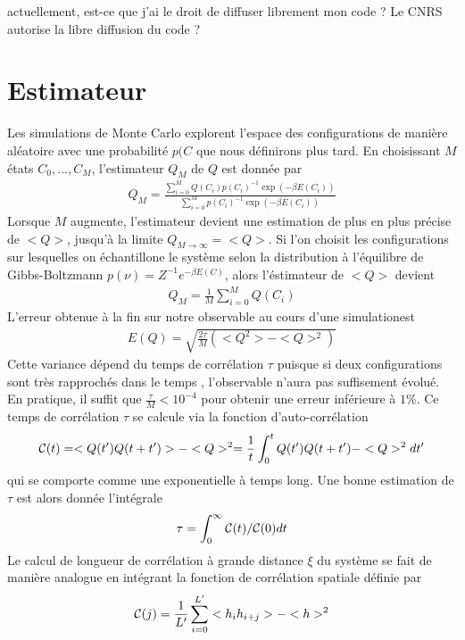 {\color{red} actuellement, est-ce que j'ai le droit de diffuser librement mon code ? Le CNRS autorise la libre diffusion du code ?}

    \section{Estimateur}

Les simulations de Monte Carlo explorent l'espace des configurations de manière aléatoire \cite{newman_monte_1999} avec une probabilité $p(C$ que nous définirons plus tard. En choisissant $M$ états ${C_0,...,C_M}$, l'estimateur $Q_M$ de $Q$ est donnée par
\begin{align}
    Q_M = \frac{\sum_{i=0}^M Q(C_i) p(C_i)^{-1} \exp(-\beta E(C_i))}{\sum_{i=0}^M  p(C_i)^{-1} \exp(-\beta E(C_i))}
\end{align}
Lorsque $M$ augmente, l'estimateur devient une estimation de plus en plus précise de $<Q>$, jusqu'à la limite $Q_{M\to \infty} = <Q>$. Si l'on choisit les configurations sur lesquelles on échantillone le système selon la distribution à l'équilibre de Gibbs-Boltzmann $p(\nu) = Z^{-1} e^{-\beta E(C)}$, alors l'éstimateur de $<Q>$ devient
\begin{align}
    Q_M = \frac{1}{M} \sum_{i=0}^M Q(C_i)
\end{align}
L'erreur obtenue à la fin sur notre observable au cours d'une simulationest
\begin{align}
	E(Q) = \sqrt{\frac{2 \tau}{M} (<Q^2>-<Q>^2)} 
\end{align}
Cette variance dépend du temps de corrélation $\tau$ puisque si deux configurations sont très rapprochés dans le temps , l'observable n'aura pas suffisement évolué. En pratique, il suffit que $\frac{\tau}{M} \less 10^{-4}$ pour obtenir une erreur inférieure à $1\%$. Ce temps de corrélation $\tau$ se calcule via la fonction d'auto-corrélation 
\begin{align}
\mathcal{C}(t) = <Q(t')Q(t+t')>- <Q>^2 = \frac{1}{t}\int_0^t Q(t')Q(t+t')-<Q>^2 dt' 
\end{align}
qui se comporte comme une exponentielle à temps long\cite{wansleben_monte_1991}. Une bonne estimation de $\tau$ est alors donnée l'intégrale
\begin{align}
	\tau = \int_0^{\infty} \mathcal{C}(t)/\mathcal{C}(0) dt
	\label{tau_cor}
\end{align}
Le calcul de longueur de corrélation à grande distance $\xi$ du système se fait de manière analogue en intégrant la fonction de corrélation spatiale définie par
\begin{align}
\mathcal{C}(j) = \frac{1}{L'} \sum_{i=0}^{L'} <h_i h_{i+j}>-<h>^2 
\end{align}


